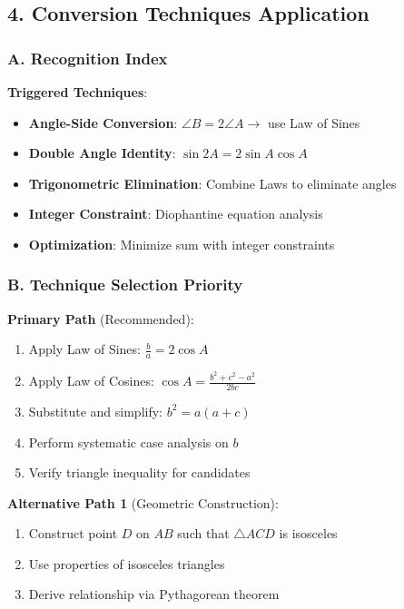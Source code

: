 \documentclass[12pt]{article}
\begin{document}
\begin{techniquesbox}
\subsection*{4. Conversion Techniques Application}

\subsubsection*{A. Recognition Index}

\textbf{Triggered Techniques}:
\begin{itemize}
    \item \textbf{Angle-Side Conversion}: $\angle B = 2\angle A \to$ use Law of Sines
    \item \textbf{Double Angle Identity}: $\sin 2A = 2\sin A \cos A$
    \item \textbf{Trigonometric Elimination}: Combine Laws to eliminate angles
    \item \textbf{Integer Constraint}: Diophantine equation analysis
    \item \textbf{Optimization}: Minimize sum with integer constraints
\end{itemize}

\subsubsection*{B. Technique Selection Priority}

\textbf{Primary Path} (Recommended):
\begin{enumerate}
    \item Apply Law of Sines: $\frac{b}{a} = 2\cos A$
    \item Apply Law of Cosines: $\cos A = \frac{b^2+c^2-a^2}{2bc}$
    \item Substitute and simplify: $b^2 = a(a+c)$
    \item Perform systematic case analysis on $b$
    \item Verify triangle inequality for candidates
\end{enumerate}

\textbf{Alternative Path 1} (Geometric Construction):
\begin{enumerate}
    \item Construct point $D$ on $AB$ such that $\triangle ACD$ is isosceles
    \item Use properties of isosceles triangles
    \item Derive relationship via Pythagorean theorem
\end{enumerate}


\end{techniquesbox}
\end{document}
